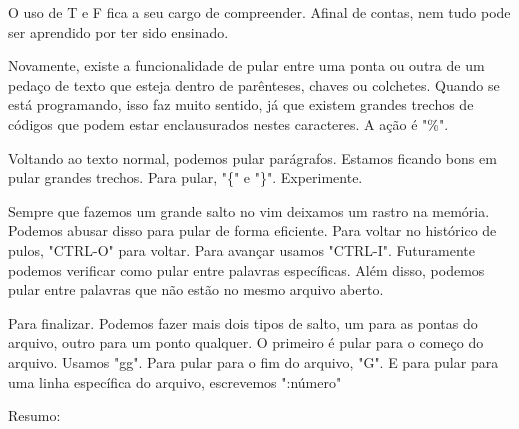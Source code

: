 \documentclass[a4paper, 12pt]{article}
\begin{document}
O uso de T e F fica a seu cargo de compreender.
Afinal de contas, nem tudo pode ser aprendido por ter sido ensinado.

Novamente, existe a funcionalidade de pular entre uma ponta ou outra de um pedaço de texto que esteja dentro de parênteses, chaves ou colchetes.
Quando se está programando, isso faz muito sentido, já que existem grandes trechos de códigos que podem estar enclausurados nestes caracteres.
A ação é "\%".

Voltando ao texto normal, podemos pular parágrafos.
Estamos ficando bons em pular grandes trechos.
Para pular, "\{" e "\}". Experimente.

Sempre que fazemos um grande salto no vim deixamos um rastro na memória.
Podemos abusar disso para pular de forma eficiente.
Para voltar no histórico de pulos, "CTRL-O" para voltar.
Para avançar usamos "CTRL-I".
Futuramente podemos verificar como pular entre palavras específicas.
Além disso, podemos pular entre palavras que não estão no mesmo arquivo aberto.

Para finalizar.
Podemos fazer mais dois tipos de salto, um para as pontas do arquivo, outro para um ponto qualquer.
O primeiro é pular para o começo do arquivo.
Usamos "gg".
Para pular para o fim do arquivo, "G".
E para pular para uma linha específica do arquivo, escrevemos ":número"

Resumo:
\end{document}
